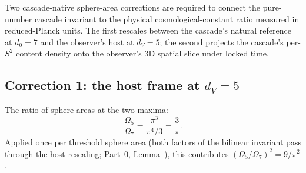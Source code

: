 \documentclass[11pt,a4paper]{article}
\begin{document}
Two cascade-native sphere-area corrections are required to connect the
pure-number cascade invariant to the physical cosmological-constant
ratio measured in reduced-Planck units. The first rescales between the
cascade's natural reference at $d_0 = 7$ and the observer's host at
$d_V = 5$; the second projects the cascade's per-$S^2$ content density
onto the observer's 3D spatial slice under locked time.

\subsection{Correction 1: the host frame at \texorpdfstring{$d_V = 5$}{d\_V = 5}}

The ratio of sphere areas at the two maxima:
\[
\frac{\Omega_5}{\Omega_7} = \frac{\pi^3}{\pi^4/3} = \frac{3}{\pi}.
\]
Applied once per threshold sphere area (both factors of the bilinear
invariant pass through the host rescaling; Part~0, Lemma~), this
contributes $(\Omega_5/\Omega_7)^2 = 9/\pi^2$.
\end{document}
